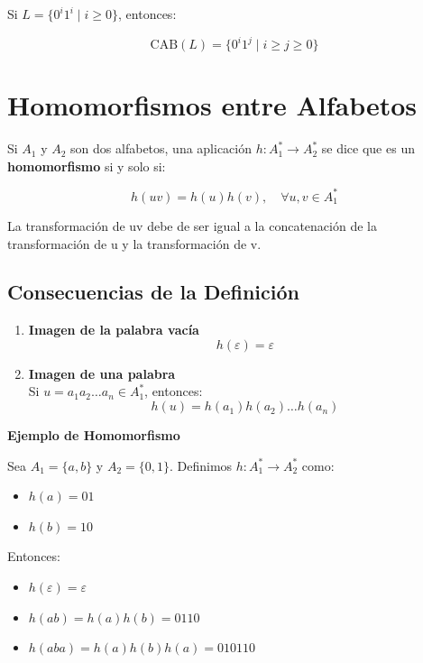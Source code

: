 \documentclass[12pt]{book} %
\begin{document}
\begin{ejemplo}
Si $L = \{0^i1^i \mid i \geq 0\}$, entonces:

$$
\text{CAB}(L) = \{0^i1^j \mid i \geq j \geq 0\}
$$
\end{ejemplo}

\hypertarget{homomorfismos-entre-alfabetos}{%
\section{Homomorfismos entre
Alfabetos}\label{homomorfismos-entre-alfabetos}}

\begin{definicion}
Si $A_1$ y $A_2$ son dos alfabetos, una aplicación $h : A_1^* \to A_2^*$ se dice que es un \textbf{homomorfismo} si y solo si:

$$
h(uv) = h(u)h(v), \quad \forall u, v \in A_1^*
$$

La transformación de uv debe de ser igual a la concatenación de la transformación de u y la transformación de v.
\end{definicion}

\hypertarget{consecuencias-de-la-definiciuxf3n}{%
\subsection{Consecuencias de la
Definición}\label{consecuencias-de-la-definiciuxf3n}}

\begin{enumerate}
\def\labelenumi{\arabic{enumi}.}
\item
  \textbf{Imagen de la palabra vacía}\\
  \[
   h(\varepsilon) = \varepsilon
   \]
\item
  \textbf{Imagen de una palabra}\\
  Si \(u = a_1a_2 \ldots a_n \in A_1^*\), entonces: \[
   h(u) = h(a_1)h(a_2) \ldots h(a_n)
   \]
\end{enumerate}

\begin{ejemplo}
    \textbf{Ejemplo de Homomorfismo}

    Sea $A_1 = \{a, b\}$ y $A_2 = \{0, 1\}$. Definimos $h : A_1^* \to A_2^*$ como:

    \begin{itemize}
        \item $h(a) = 01$
        \item $h(b) = 10$
    \end{itemize}

    Entonces:

    \begin{itemize}
        \item $h(\varepsilon) = \varepsilon$
        \item $h(ab) = h(a)h(b) = 0110$
        \item $h(aba) = h(a)h(b)h(a) = 010110$
    \end{itemize}
\end{ejemplo}
\end{document}
